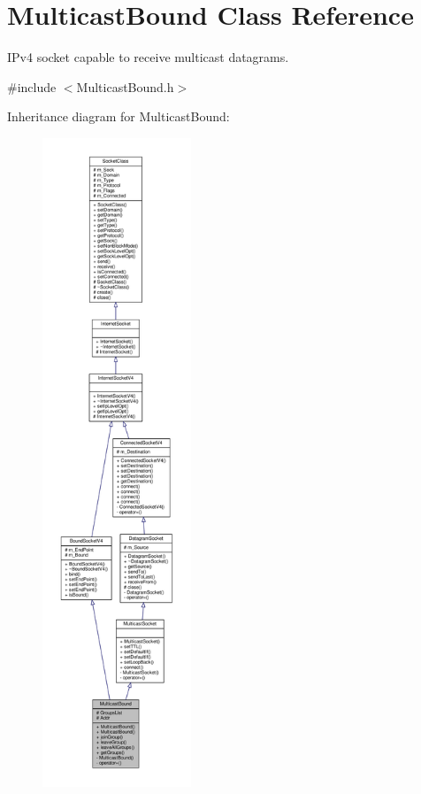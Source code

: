 \hypertarget{classMulticastBound}{}\section{Multicast\+Bound Class Reference}
\label{classMulticastBound}


I\+Pv4 socket capable to receive multicast datagrams.  




{\ttfamily \#include $<$Multicast\+Bound.\+h$>$}



Inheritance diagram for Multicast\+Bound\+:\nopagebreak
\begin{figure}[H]
\begin{center}
\leavevmode
\includegraphics[height=550pt]{classMulticastBound__inherit__graph}
\end{center}
\end{figure}
